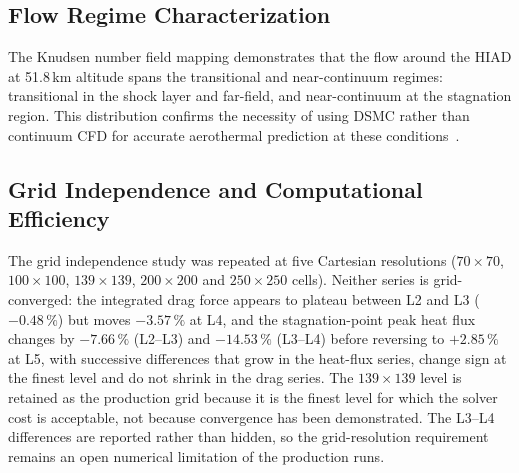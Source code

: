 \subsection{Flow Regime Characterization}
The Knudsen number field mapping demonstrates that the flow around the HIAD at 51.8\,km altitude spans the transitional and near-continuum regimes: transitional in the shock layer and far-field, and near-continuum at the stagnation region. This distribution confirms the necessity of using DSMC rather than continuum CFD for accurate aerothermal prediction at these conditions~\cite{bird1994molecular, plimpton2014sparta}.

\subsection{Grid Independence and Computational Efficiency}
The grid independence study was repeated at five Cartesian resolutions ($70\times70$, $100\times100$, $139\times139$, $200\times200$ and $250\times250$ cells). Neither series is grid-converged: the integrated drag force appears to plateau between L2 and L3 ($-0.48\,\%$) but moves $-3.57\,\%$ at L4, and the stagnation-point peak heat flux changes by $-7.66\,\%$ (L2--L3) and $-14.53\,\%$ (L3--L4) before reversing to $+2.85\,\%$ at L5, with successive differences that grow in the heat-flux series, change sign at the finest level and do not shrink in the drag series. The $139\times139$ level is retained as the production grid because it is the finest level for which the solver cost is acceptable, not because convergence has been demonstrated. The L3--L4 differences are reported rather than hidden, so the grid-resolution requirement remains an open numerical limitation of the production runs.


